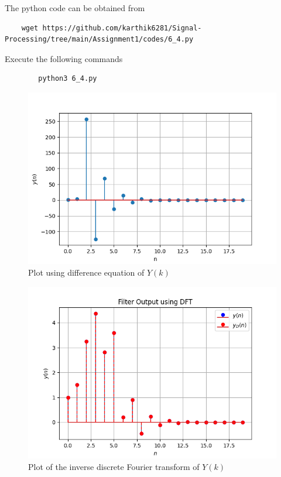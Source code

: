 \documentclass[journal,12pt,twocolumn]{IEEEtran}
\renewcommand\thesection{\arabic{section}}
\begin{document}
\begin{enumerate}[label=\thesection.\arabic*]
	\solution The python code can be obtained from 
	\begin{lstlisting}
	wget https://github.com/karthik6281/Signal-Processing/tree/main/Assignment1/codes/6_4.py
	\end{lstlisting}
	
	Execute the following commands
	\begin{lstlisting}
		python3 6_4.py
	\end{lstlisting}

    \begin{figure}[!ht]
	\centering
     \begin{center}
     	\includegraphics[width=\columnwidth]{./figs/6_3_1.png}
     \end{center}
     \caption{Plot using difference equation of $Y(k)$}
     \label{fig-6.4.1}
    \end{figure}

     \begin{figure}[!ht]
   	 \centering
   	 \includegraphics[width=\columnwidth]{./figs/6_3_2.png}
   	 \caption{Plot of the inverse discrete Fourier transform of $Y(k)$}
   	 \label{fig-6.4.2}	
     \end{figure}
	

\end{enumerate}
\end{document}
